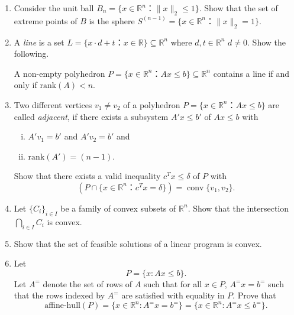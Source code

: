 \documentclass[11pt]{article}
\institute{\'Ecole Polytechnique F\'ed\'erale de Lausanne}
\DeclareMathOperator{\conv}{conv}
\newcommand{\setR}{\mathbb{R}}
\newcommand{\rank}{\mathrm{rank}}
\begin{document}
\makeheader

\begin{enumerate}[1)]

\item  \label{item:ex-9}
  Consider the unit ball $B_n = \{ x ∈ ℝ^n ： \|x\|_2≤1\}$. Show that the set of extreme points of $B$ is the sphere $S^{(n-1)} = \{ x ∈ ℝ^n ： \|x\|_2 =1\}$.
\item \label{item:10}
  A \emph{line} is a set $L = \{ x ⋅ d +t ： x ∈ ℝ\} ⊆ ℝ^n$ where $d,t ∈ ℝ^n$ $d ≠0$. Show the following.

  A non-empty polyhedron $P = \{ x ∈ ℝ^n ： Ax ≤ b\} ⊆ ℝ^n$ contains a line if  and only if $\rank(A) <n$.

\item \label{item:11} Two different vertices $v_1 ≠ v_2$ of a polyhedron $P = \{ x ∈ ℝ^n ： Ax≤b\}$ are called \emph{adjacent}, if there exists a subsystem $A'x ≤ b'$ of $Ax≤b$ with
\begin{enumerate}[i)] 
\item $A'v_1 = b'$ and $A'v_2 = b'$  and
\item $\rank(A') = (n-1)$. 
\end{enumerate}

Show that there exists a valid inequality $c^Tx ≤ δ$ of $P$ with
\begin{displaymath}
 \left( P ∩ \{ x ∈ ℝ^n ： c^Tx = δ \} \right) = \conv\{v_1,v_2\}. 
\end{displaymath}
\item Let $\{C_i\}_{i\in I}$ be a family of convex subsets of $\setR^n$.
  Show that the intersection $\bigcap_{i\in I} C_i$ is convex.
\item Show that the set of feasible solutions  of a linear program  is
  convex. \label{conv:item:1}
  
  \item Let $$P= \{x: Ax≤b\}.$$ 
  Let $A^=$ denote the set of rows of $A$ such that for all $x \in P$, $A^= x = b^=$ such that the rows indexed by $A^=$ are satisfied with equality in $P$. 
  Prove that 
$$\text{aﬃne-hull}(P) = \{x∈\setR^n : A^=
x= b^=\}= \{x∈\setR^n : A^=
x≤b^=\}.$$



\end{enumerate}



  
\end{document}
